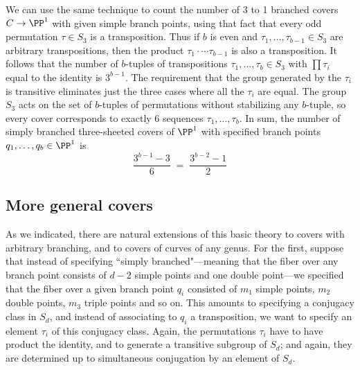 We can use the same technique to count the number of 3 to 1 branched covers $C \to \PP^1$ with given simple branch points, using that fact that every odd permutation $\tau \in S_3$ is a transposition. Thus if $b$ is even and  $\tau_1,\dots,\tau_{b-1} \in S_3$ are arbitrary transpositions, then the product 
$\tau_1\cdot \cdots\tau_{b-1}$ is also a
 transposition. It follows that the number of $b$-tuples of transpositions $\tau_1,\dots,\tau_{b} \in S_3$ with $\prod \tau_i$ equal to the identity is $3^{b-1}$. The requirement that the group generated by the $\tau_i$ is transitive eliminates just the three cases where all the $\tau_i$ are equal. The group $S_3$ acts on the set of $b$-tuples of permutations without stabilizing any $b$-tuple, so every cover corresponds to exactly 6 sequences
  $\tau_1,\dots,\tau_b$. In sum, the number of simply branched three-sheeted covers of $\PP^1$ with specified branch points $q_1,\dots,q_b \in \PP^1$ is
$$
\frac{3^{b-1} - 3}{6} \; = \; \frac{3^{b-2} - 1}{2} 
$$


\subsection{More general covers}\label{general covers}

As we indicated, there are natural extensions of this basic theory to covers with arbitrary branching, and to covers of curves of any genus. For the first, suppose that instead of specifying ``simply branched"---meaning that the fiber over any branch point consists of $d-2$ simple points and one double point---we specified that the fiber over a given branch point $q_i$ consisted of $m_1$ simple points, $m_2$ double points, $m_3$ triple points and so on. This amounts to specifying a conjugacy class in $S_d$, and instead of associating to $q_i$ a transposition, we want to specify an element $\tau_i$ of this conjugacy class. Again, the permutations $\tau_i$ have to have product the identity, and to generate a transitive subgroup of $S_d$; and again, they are determined up to simultaneous conjugation by an element of $S_d$.


